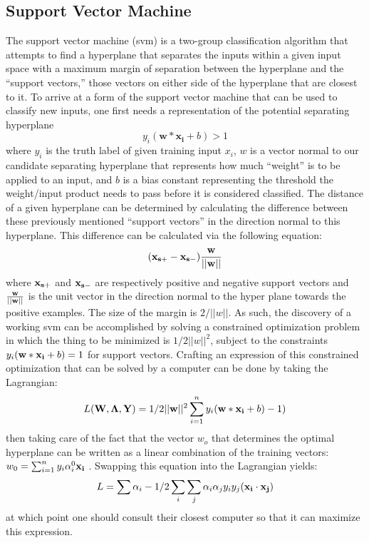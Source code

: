 \subsection{Support Vector Machine}
The support vector machine (svm) is a two-group classification algorithm that
attempts to find a hyperplane that separates the inputs within a given input
space with a maximum margin of separation between the hyperplane and the
``support vectors,'' those vectors on either side of the hyperplane
that are closest to it. To arrive at a form of the support vector machine that
can be used to classify new inputs, one first needs a representation of the
potential separating hyperplane $$y_i(\mathbf{w}*\mathbf{x_i} + b) > 1$$ where
$y_i$ is the truth label of given training input $x_i$, $w$ is a vector
normal to our candidate separating hyperplane that represents how much
``weight'' is to be applied to an input, and $b$ is a bias constant representing
the threshold the weight/input product needs to pass before it is considered
classified. The distance of a given hyperplane can be determined by calculating
the difference between these previously mentioned ``support vectors'' in the
direction normal to this hyperplane. This difference can be calculated via the
following equation:
$$(\bold{x_{s+}}-\bold{x_{s-}})\bold{\frac{w}{||w||}}$$ where $\bold{x_{s+}}$
and $\bold{x_{s-}}$ are respectively positive and negative support vectors and
$\bold{\frac{w}{||w||}}$ is the unit vector in the direction normal to the hyper
plane towards the positive examples. The size of the margin is $2/||w||$. As
such, the discovery of a working svm can be accomplished by solving a constrained
optimization problem in which the thing to be minimized is $1/2||w||^2$, subject
to the constraints $y_i(\bold{w}*\bold{x_i} + b) = 1$ for support vectors.
Crafting an expression of this constrained optimization that can be solved by a
computer can be done by taking the Lagrangian:
$$L(\bold{W},\bold{\Lambda}, \bold{Y}) = 1/2||\bold{w}||^2 \sum_{i=1}^{n}y_i(\bold{w}*\bold{x_i}+b)-1)$$
then taking care of the fact that the vector $w_o$ that determines the optimal
hyperplane can be written as a linear combination of the training vectors:
$w_{0}=\sum_{i=1}^{n}y_{i}\alpha_{i}^{0}\bold{x_i}$ \cite{Vapnik}. Swapping this
equation into the Lagrangian yields:
$$L = \sum \alpha_{i} - 1/2 \sum_{i}\sum_{j}\alpha_{i}\alpha_{j}y_{i}y_{j}(\bold{x_i}\cdot\bold{x_j})$$
at which point one should consult their closest computer so that it can maximize
this expression.

